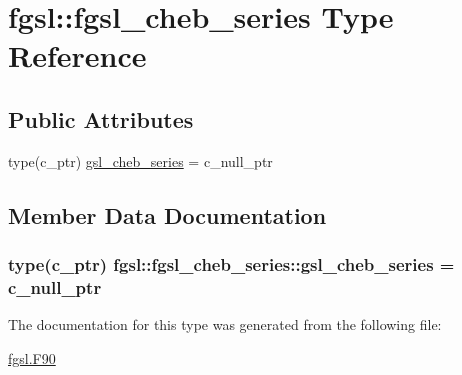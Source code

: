 \hypertarget{structfgsl_1_1fgsl__cheb__series}{\section{fgsl\-:\-:fgsl\-\_\-cheb\-\_\-series Type Reference}
\label{structfgsl_1_1fgsl__cheb__series}
}
\subsection*{Public Attributes}
\begin{DoxyCompactItemize}
\item 
type(c\-\_\-ptr) \hyperlink{structfgsl_1_1fgsl__cheb__series_a89c19d0c070d4d0ae5f923df74f69e96}{gsl\-\_\-cheb\-\_\-series} = c\-\_\-null\-\_\-ptr
\end{DoxyCompactItemize}


\subsection{Member Data Documentation}
\hypertarget{structfgsl_1_1fgsl__cheb__series_a89c19d0c070d4d0ae5f923df74f69e96}{
\subsubsection[{gsl\-\_\-cheb\-\_\-series}]{\setlength{\rightskip}{0pt plus 5cm}type(c\-\_\-ptr) fgsl\-::fgsl\-\_\-cheb\-\_\-series\-::gsl\-\_\-cheb\-\_\-series = c\-\_\-null\-\_\-ptr}}\label{structfgsl_1_1fgsl__cheb__series_a89c19d0c070d4d0ae5f923df74f69e96}


The documentation for this type was generated from the following file\-:\begin{DoxyCompactItemize}
\item 
\hyperlink{fgsl_8F90}{fgsl.\-F90}\end{DoxyCompactItemize}
